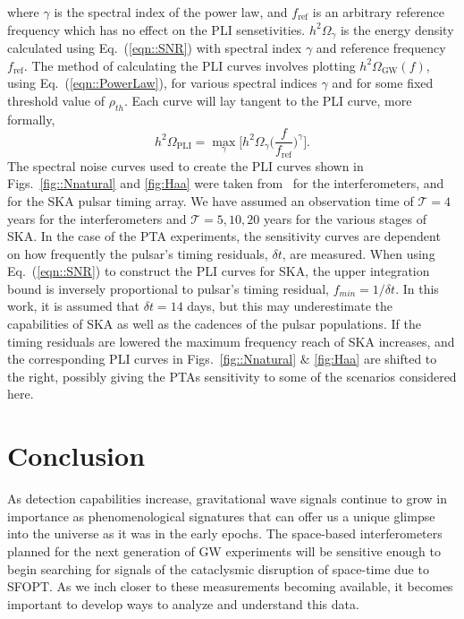 \documentclass[nofootinbib,twocolumn,preprintnumbers]{revtex4-1}
\begin{document}
where $\gamma$ is the spectral index of the power law, and $f_{\textrm{ref}}$ is an arbitrary reference frequency which has no effect on the PLI sensetivities.  $h^2 \Omega_{\gamma} $ is the energy density calculated using Eq.~(\ref{eqn::SNR}) with spectral index $\gamma$  and reference frequency $f_{\textrm{ref}}$. The method of calculating the PLI curves involves plotting $h^2 \Omega_{\textrm{GW}}(f) $, using Eq.~(\ref{eqn::PowerLaw}), for various spectral indices $\gamma$ and for some fixed threshold value of $\rho_{th}$. Each curve will lay tangent to the PLI curve, more formally,
\begin{equation}
h^2 \Omega_{\textrm{PLI}} = \max\limits_{\gamma}\bigg[ h^2 \Omega_{\gamma}\bigg(\frac{f}{f_{\textrm{ref}}}\bigg)^{\gamma}  \bigg].
\end{equation}
The spectral noise curves used to create the PLI curves shown in Figs.~\ref{fig::Nnatural} and \ref{fig:Haa} were taken 
from~\citep{Robson_2019,PhysRevD.83.084036,doi:10.1142/S0218271813410137,10.1093/ptep/pty078, Breitbach:2018ddu} for the interferometers, and~\citep{Breitbach:2018ddu, Janssen:2014dka} 
for the SKA pulsar timing array. 
We have assumed an observation time of $\mathcal{T} = 4 $ years for the interferometers and $\mathcal{T}= 5, 10, 20 $  years for the various stages of SKA. 
In the case of the PTA experiments, the sensitivity curves are dependent on how frequently the pulsar's timing residuals, $\delta t$, are measured. 
When using Eq.~(\ref{eqn::SNR}) to construct the PLI curves for SKA, the upper integration bound is inversely proportional to pulsar's timing residual, $f_{min} = 1/\delta t$.  In this work, it is assumed that $\delta t = 14$ days, but this may underestimate the capabilities of SKA as well as the cadences of the pulsar populations. If the timing residuals are lowered the maximum frequency reach of SKA increases, and the corresponding PLI curves in Figs.~\ref{fig::Nnatural} $\&$ \ref{fig:Haa} are shifted to the right, possibly giving the PTAs sensitivity to some of the scenarios considered here.


\section{Conclusion}
\label{sec:conclusion}

As detection capabilities increase, gravitational wave signals continue to grow in importance as phenomenological signatures that can offer us a unique glimpse into the universe as it was in the early epochs. The space-based interferometers planned for the next generation of GW experiments will be sensitive enough to begin searching for signals of the cataclysmic disruption of space-time due to SFOPT. As we inch closer to these measurements becoming available, it becomes important to develop ways to analyze and understand this data.
\end{document}
